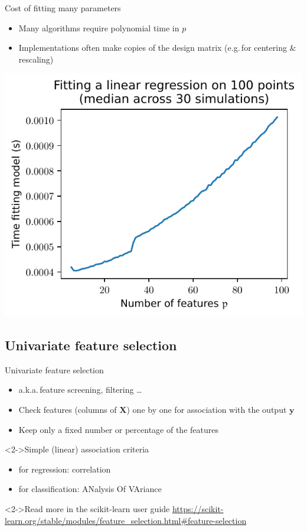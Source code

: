\documentclass[presentation,mathserif,table]{beamer}
\newcommand{\eg}{e.g.\,}
\newcommand{\aka}{a.k.a.\,}
\newcommand{\X}{{\mathbold X}}
\newcommand{\y}{{\mathbold y}}
\begin{document}
\begin{frame}[label={sec:orgafca2fa}]{Cost of fitting many parameters}
\begin{itemize}
\item Many algorithms require polynomial time in \(p\)
\item Implementations often make copies of the design matrix (\eg for centering \& rescaling)
\end{itemize}
\begin{center}
\includegraphics[height=.7\textheight]{figures/generated/ridge_overfitting/durations.pdf}
\end{center}
\end{frame}
\subsection{Univariate feature selection}
\label{sec:org826ee8d}
\begin{frame}[label={sec:org8fcfcc6}]{Univariate feature selection}
\begin{itemize}
\item \aka feature screening, filtering \ldots{}
\item Check features (columns of \(\X\)) one by one for association with the output \(\y\)
\item Keep only a fixed number or percentage of the features
\end{itemize}
\begin{block}<2->{Simple (linear) association criteria}
\begin{itemize}
\item for regression: correlation
\item for classification: ANalysis Of VAriance
\end{itemize}
\end{block}
\begin{block}<2->{Read more in the scikit-learn user guide}
\url{https://scikit-learn.org/stable/modules/feature\_selection.html\#feature-selection}
\end{block}
\end{frame}
\end{document}
